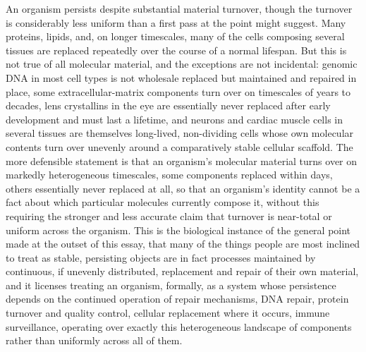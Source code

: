 \documentclass[11pt]{article}
\begin{document}
An organism persists despite substantial material turnover, though the turnover is considerably less uniform than a first pass at the point might suggest. Many proteins, lipids, and, on longer timescales, many of the cells composing several tissues are replaced repeatedly over the course of a normal lifespan. But this is not true of all molecular material, and the exceptions are not incidental: genomic DNA in most cell types is not wholesale replaced but maintained and repaired in place, some extracellular-matrix components turn over on timescales of years to decades, lens crystallins in the eye are essentially never replaced after early development and must last a lifetime, and neurons and cardiac muscle cells in several tissues are themselves long-lived, non-dividing cells whose own molecular contents turn over unevenly around a comparatively stable cellular scaffold. The more defensible statement is that an organism's molecular material turns over on markedly heterogeneous timescales, some components replaced within days, others essentially never replaced at all, so that an organism's identity cannot be a fact about which particular molecules currently compose it, without this requiring the stronger and less accurate claim that turnover is near-total or uniform across the organism. This is the biological instance of the general point made at the outset of this essay, that many of the things people are most inclined to treat as stable, persisting objects are in fact processes maintained by continuous, if unevenly distributed, replacement and repair of their own material, and it licenses treating an organism, formally, as a system whose persistence depends on the continued operation of repair mechanisms, DNA repair, protein turnover and quality control, cellular replacement where it occurs, immune surveillance, operating over exactly this heterogeneous landscape of components rather than uniformly across all of them.
\end{document}
